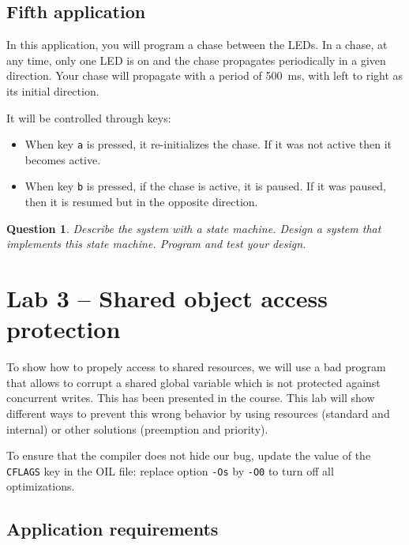 \documentclass[11pt]{report}
\newtheorem{ex}{Question}
\begin{document}
\section{Fifth application}

In this application, you will program a chase between the LEDs.
In a chase, at any time, only one LED is on and the chase propagates periodically in a given direction.
Your chase will propagate with a period of \SI{500}{\milli\second}, with left to right as its initial direction.

It will be controlled through keys:
\begin{itemize}
  \item
    When key \verb-a- is pressed, it re-initializes the chase.
    If it was not active then it becomes active.
  \item
    When key \verb-b- is pressed, if the chase is active, it is paused.
    If it was paused, then it is resumed but in the opposite direction.
\end{itemize}

\begin{ex}
  Describe the system with a state machine.
  Design a system that implements this state machine.
  Program and test your design.
\end{ex}

\chapter{Lab 3 -- Shared object access protection}

To show how to propely access to shared resources, we will use a bad program that allows to corrupt a shared global variable which is not protected against concurrent writes. This has been presented in the course. This lab will show different ways to prevent this wrong behavior by using resources (standard and internal) or other solutions (preemption and priority).

To ensure that the compiler does not hide our bug, update the value of the \texttt{CFLAGS} key in the OIL file: replace option \texttt{-Os} by \texttt{-O0} to turn off all optimizations.

\section{Application requirements}
\label{sec:sharedrez}

\end{document}
